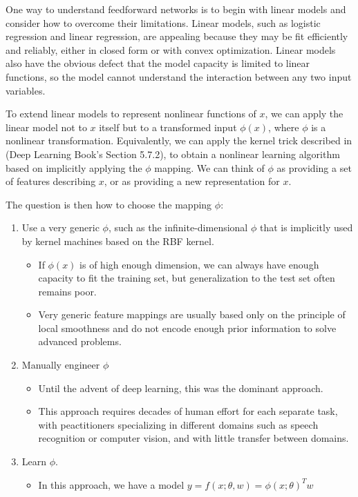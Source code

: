 \documentclass{report}
\begin{document}
\noindent One way to understand feedforward networks is to begin with linear models and consider how to overcome their limitations. Linear models, such as logistic regression and linear regression, are appealing because they may be fit efficiently and reliably, either in closed form or with convex optimization. Linear models also have the obvious defect that the model capacity is limited to linear functions, so the model cannot understand the interaction between any two input variables.\newline

\noindent To extend linear models to represent nonlinear functions of $x$, we can apply the linear model not to $x$ itself but to a transformed input $\phi(x)$, where $\phi$ is a nonlinear transformation. Equivalently, we can apply the kernel trick described in (Deep Learning Book's Section 5.7.2), to obtain a nonlinear learning algorithm based on implicitly applying the $\phi$ mapping. We can think of $\phi$ as providing a set of features describing $x$, or as providing a new representation for $x$.

\noindent The question is then how to choose the mapping $\phi$:
\begin{enumerate}
	\item Use a very generic $\phi$, such as the infinite-dimensional $\phi$ that is implicitly used by kernel machines based on the RBF kernel.\newline
    	\begin{itemize}
    		\item If $\phi(x)$ is of high enough dimension, we can always have enough capacity to fit the training set, but generalization to the test set often remains poor.
            \item Very generic feature mappings are usually based only on the principle of local smoothness and do not encode enough prior information to solve advanced problems.
    	\end{itemize}
    \item Manually engineer $\phi$\newline
    	\begin{itemize}
    		\item Until the advent of deep learning, this was the dominant approach.
            \item This approach requires decades of human effort for each separate task, with peactitioners specializing in different domains such as speech recognition or computer vision, and with little transfer between domains.
    	\end{itemize}
    \item Learn $\phi$.\newline
    	\begin{itemize}
    		\item In this approach, we have a model $y=f(x; \theta, w) = \phi(x; \theta)^Tw$
    	\end{itemize}
\end{enumerate}
\end{document}
